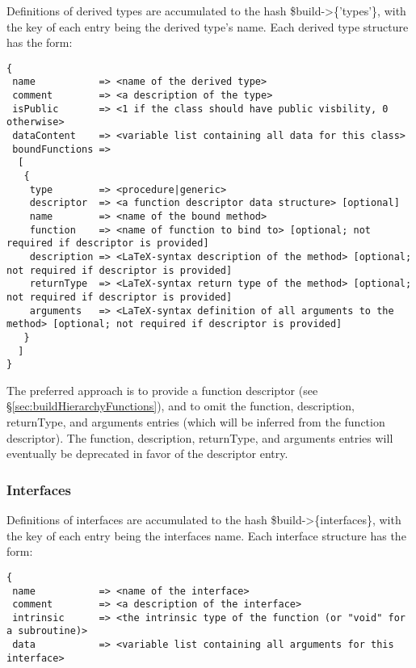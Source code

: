 Definitions of derived types are accumulated to the hash {\normalfont \ttfamily \$build->\{'types'\}}, with the key of each entry being the derived type's name. Each derived type structure has the form:
\begin{verbatim}
{
 name           => <name of the derived type>
 comment        => <a description of the type>
 isPublic       => <1 if the class should have public visbility, 0 otherwise>
 dataContent    => <variable list containing all data for this class>
 boundFunctions => 
  [
   {
    type        => <procedure|generic>
    descriptor  => <a function descriptor data structure> [optional]
    name        => <name of the bound method>
    function    => <name of function to bind to> [optional; not required if descriptor is provided]
    description => <LaTeX-syntax description of the method> [optional; not required if descriptor is provided]
    returnType  => <LaTeX-syntax return type of the method> [optional; not required if descriptor is provided]
    arguments   => <LaTeX-syntax definition of all arguments to the method> [optional; not required if descriptor is provided]
   }
  ]
}
\end{verbatim}
The preferred approach is to provide a function descriptor (see \S\ref{sec:buildHierarchyFunctions}), and to omit the {\normalfont \ttfamily function}, {\normalfont \ttfamily description}, {\normalfont \ttfamily returnType}, and {\normalfont \ttfamily arguments} entries (which will be inferred from the function descriptor). The {\normalfont \ttfamily function}, {\normalfont \ttfamily description}, {\normalfont \ttfamily returnType}, and {\normalfont \ttfamily arguments} entries will eventually be deprecated in favor of the {\normalfont \ttfamily descriptor} entry.

\subsubsection{Interfaces}\label{sec:buildHierarchyInterfaces}

Definitions of interfaces are accumulated to the hash {\normalfont \ttfamily \$build->\{interfaces\}}, with the key of each entry being the interfaces name. Each interface structure has the form:
\begin{verbatim}
{
 name           => <name of the interface>
 comment        => <a description of the interface>
 intrinsic      => <the intrinsic type of the function (or "void" for a subroutine)> 
 data           => <variable list containing all arguments for this interface>
\end{verbatim}

